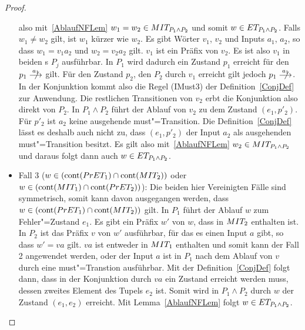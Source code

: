 \begin{proof}
\begin{itemize}
      also mit~\ref{AblaufNFLem} $w_1=w_2\in MIT _{P_1\land P_2}$ und somit
      $w\in ET _{P_1\land P_2}$. Falls $w_1\neq w_2$ gilt, ist \oBdA{} $w_1$
      kürzer wie $w_2$. Es gibt Wörter $v_1$, $v_2$ und Inputs $a_1$, $a_2$, so
      dass $w_1=v_1a_2$ und $w_2=v_2a_2$ gilt. $v_1$ ist ein Präfix von $v_2$.
      Es ist also $v_1$ in beiden \MEIO{}s $P_j$ ausführbar. In $P_1$ wird
      dadurch ein Zustand $p_1$ erreicht für den $p_1\nmust[a_1]$ gilt. Für den
      Zustand $p_2$, den $P_2$ durch $v_1$ erreicht gilt jedoch
      $p_1\nmust[a_1]$. In der Konjunktion kommt also die Regel (IMust3) der
      Definition~\ref{ConjDef} zur Anwendung. Die restlichen Transitionen von
      $v_2$ erbt die Konjunktion also direkt von $P_2$. In $P_1\land P_2$ führt
      der Ablauf von $v_2$ zu dem Zustand $(e_1,p'_2)$. Für $p'_2$ ist $a_2$
      keine ausgehende must"=Transition. Die Definition~\ref{ConjDef} lässt es
      deshalb auch nicht zu, dass $(e_1,p'_2)$ der Input $a_2$ als ausgehenden
      must"=Transition besitzt. Es gilt also mit~\ref{AblaufNFLem} $w_2\in MIT
      _{P_1\land P_2}$ und daraus folgt dann auch $w\in ET _{P_1\land P_2}$.
    \item Fall 3 ($w\in (\mathrm{cont} (PrET _1)\cap \mathrm{cont} (MIT _2))$ oder $w\in
      (\mathrm{cont} (MIT _1)\cap \mathrm{cont} (PrET _2))$): Die beiden hier Vereinigten
      Fälle sind symmetrisch, somit kann \oBdA{} davon ausgegangen werden, dass
      $w\in (\mathrm{cont} (PrET _1)\cap \mathrm{cont} (MIT _2))$ gilt. In $P_1$ führt der
      Ablauf $w$ zum Fehler"=Zustand $e_1$. Es gibt ein Präfix $w'$ von $w$,
      dass in $MIT _2$ enthalten ist. In $P_2$ ist das Präfix $v$ von $w'$
      ausführbar, für das es einen Input $a$ gibt, so dass $w'=va$ gilt. $va$
      ist entweder in $MIT _1$ enthalten und somit kann der Fall 2 angewendet
      werden, oder der Input $a$ ist in $P_1$ nach dem Ablauf von $v$ durch
      eine must"=Transtion ausführbar. Mit der Definition~\ref{ConjDef} folgt
      dann, dass in der Konjunktion durch $va$ ein Zustand erreicht werden
      muss, dessen zweites Element des Tupels $e_2$ ist. Somit wird in
      $P_1\land P_2$ durch $w$ der Zustand $(e_1,e_2)$ erreicht. Mit
      Lemma~\ref{AblaufNFLem} folgt $w\in ET _{P_1\land P_2}$.
  \end{itemize}


\end{proof}
